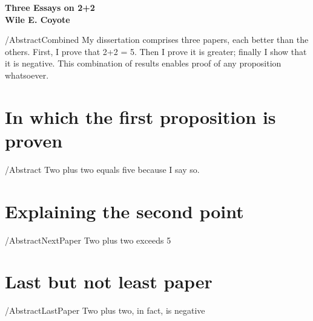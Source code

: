 \documentclass{scrartcl}
\begin{document}
\begin{center}
{\Large \textbf{Three Essays on 2+2}}
\\[5pt]
{\large \textbf{Wile E. Coyote}}

\end{center}

\begin{verbatimwrite}{\abstractpath/AbstractCombined\mymoniker}
  My dissertation comprises three papers, each better than the others.  First, I prove that 2+2 = 5.  Then I prove it is greater; finally I show that it is negative. This combination of results enables proof of any proposition whatsoever.
\end{verbatimwrite}


\section{In which the first proposition is proven}
\begin{verbatimwrite}{\abstractpath/Abstract\mymoniker}
  Two plus two equals five because I say so.
\end{verbatimwrite}


\section{Explaining the second point}
\begin{verbatimwrite}{\abstractpath/AbstractNextPaper\mymoniker}
  Two plus two exceeds 5
\end{verbatimwrite}


\section{Last but not least paper}
\begin{verbatimwrite}{\abstractpath/AbstractLastPaper\mymoniker}
  Two plus two, in fact, is negative
\end{verbatimwrite}

\end{document}
